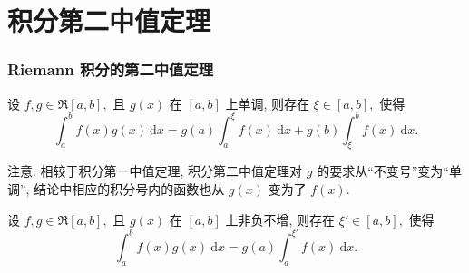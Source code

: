 
\section{积分第二中值定理}


\begin{frame}
\frametitle{Riemann 积分的第二中值定理}

\begin{thm}[积分第二中值定理]
设 $f, g \in \mathfrak{R}[a, b],$ 且 $g(x)$ 在 $[a, b]$ 上\alert{单调}, 则存在 $\xi \in [a, b],$ 使得
\begin{equation}
\int_a^b f(x) g(x) ~ \mathrm{d} x = g(a) \int_a^\xi f(x) ~ \mathrm{d} x + g(b) \int_\xi^b f(x) ~ \mathrm{d} x.
\tag{$\star$}
\label{eq:star}
\end{equation}
\end{thm}

\alert{注意:} 相较于积分第一中值定理, 积分第二中值定理对 $g$ 的要求从``不变号''变为``单调'', 结论中相应的积分号内的函数也从 $g(x)$ 变为了 $f(x).$

\pause
\vspace{0.5em}

\begin{thm}
设 $f, g \in \mathfrak{R}[a, b],$ 且 $g(x)$ 在 $[a, b]$ 上\alert{非负不增}, 则存在 $\xi' \in [a, b],$ 使得
\begin{equation}
\int_a^b f(x) g(x) ~ \mathrm{d} x = g(a) \int_a^{\xi'} f(x) ~ \mathrm{d} x.
\tag{$\star\star$}
\label{eq:star2}
\end{equation}
\end{thm}

\end{frame}


